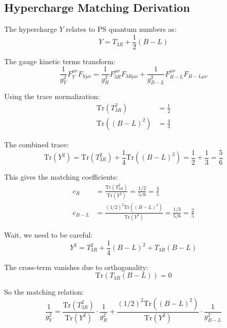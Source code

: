\documentclass[11pt,a4paper]{article}
\begin{document}
\subsection{Hypercharge Matching Derivation}
\label{subsec:hypercharge-details}

The hypercharge $Y$ relates to PS quantum numbers as:
\begin{equation}
\label{eq:Y-def-extended}
Y = T_{3R} + \frac{1}{2}(B-L)
\end{equation}

The gauge kinetic terms transform:
\begin{equation}
\label{eq:kinetic-Y}
\frac{1}{g_Y^2} F_Y^{\mu\nu} F_{Y\mu\nu} =
\frac{1}{g_R^2} F_{3R}^{\mu\nu} F_{3R\mu\nu} + \frac{1}{g_{B-L}^2} F_{B-L}^{\mu\nu} F_{B-L\mu\nu}
\end{equation}

Using the trace normalization:
\begin{align}
\label{eq:trace-T3R}
\text{Tr}(T_{3R}^2) &= \frac{1}{2} \\
\label{eq:trace-BL}
\text{Tr}((B-L)^2) &= \frac{4}{3}
\end{align}

The combined trace:
\begin{equation}
\label{eq:trace-Y}
\text{Tr}(Y^2) = \text{Tr}(T_{3R}^2) + \frac{1}{4}\text{Tr}((B-L)^2) = \frac{1}{2} + \frac{1}{3} = \frac{5}{6}
\end{equation}

This gives the matching coefficients:
\begin{align}
\label{eq:c-R-derive}
c_R &= \frac{\text{Tr}(T_{3R}^2)}{\text{Tr}(Y^2)} = \frac{1/2}{5/6} = \frac{3}{5} \\
\label{eq:c-BL-derive}
c_{B-L} &= \frac{(1/2)^2 \text{Tr}((B-L)^2)}{\text{Tr}(Y^2)} = \frac{1/3}{5/6} = \frac{2}{5}
\end{align}

Wait, we need to be careful:
\begin{equation}
\label{eq:Y-squared-coeff}
Y^2 = T_{3R}^2 + \frac{1}{4}(B-L)^2 + T_{3R}(B-L)
\end{equation}

The cross-term vanishes due to orthogonality:
\begin{equation}
\label{eq:cross-term}
\text{Tr}(T_{3R}(B-L)) = 0
\end{equation}

So the matching relation:
\begin{equation}
\label{eq:matching-full}
\frac{1}{g_Y^2} = \frac{\text{Tr}(T_{3R}^2)}{\text{Tr}(Y^2)} \cdot \frac{1}{g_R^2} +
\frac{(1/2)^2\text{Tr}((B-L)^2)}{\text{Tr}(Y^2)} \cdot \frac{1}{g_{B-L}^2}
\end{equation}
\end{document}
